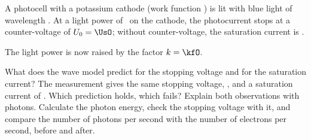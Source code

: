 A photocell with a potassium cathode (work function \WaO) is lit with blue light of wavelength \laO. At a light power of \PlO\ on the cathode, the photocurrent stops at a counter-voltage of $U_0 = \UsO$; without counter-voltage, the saturation current is \IsO.

The light power is now raised by the factor $k = \kfO$.
\begin{abcliste}
\abc What does the wave model predict for the stopping voltage and for the saturation current?
\abc The measurement gives the same stopping voltage, \UsO, and a saturation current of . Which prediction holds, which fails?
\abc Explain both observations with photons. Calculate the photon energy, check the stopping voltage with it, and compare the number of photons per second with the number of electrons per second, before and after.
\end{abcliste}
